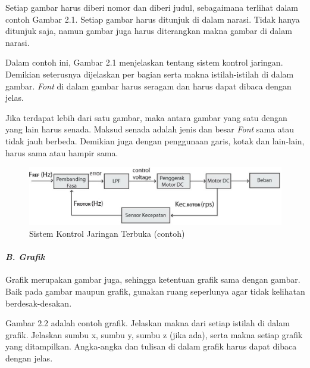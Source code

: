 \documentclass[12pt]{article}
\begin{document}
Setiap gambar harus diberi nomor dan diberi judul, sebagaimana terlihat dalam contoh Gambar 2.1. Setiap gambar harus ditunjuk di dalam narasi. Tidak hanya ditunjuk saja, namun gambar juga harus diterangkan makna gambar di dalam narasi.

Dalam contoh ini, Gambar 2.1 menjelaskan tentang sistem kontrol jaringan. Demikian seterusnya dijelaskan per bagian serta makna istilah-istilah di dalam gambar. \textit{Font} di dalam gambar harus seragam dan harus dapat dibaca dengan jelas. 

Jika terdapat lebih dari satu gambar, maka antara gambar yang satu dengan yang lain harus senada. Maksud senada adalah jenis dan besar \textit{Font} sama atau tidak jauh berbeda. Demikian juga dengan penggunaan garis, kotak dan lain-lain, harus sama atau hampir sama. 

\begin{figure}
\centering
 	\includegraphics[width=1\textwidth]{img-2.png}
 	\caption{Sistem Kontrol Jaringan Terbuka (contoh)}  
\end{figure}
\pagebreak



\paragraph{\textit{B. Grafik}}\mbox{}

Grafik merupakan gambar juga, sehingga ketentuan grafik sama dengan gambar. Baik pada gambar maupun grafik, gunakan ruang seperlunya agar tidak kelihatan berdesak-desakan.

Gambar 2.2 adalah contoh grafik. Jelaskan makna dari setiap istilah di dalam grafik. Jelaskan sumbu x, sumbu y, sumbu z (jika ada), serta makna setiap grafik yang ditampilkan. Angka-angka dan tulisan di dalam grafik harus dapat dibaca dengan jelas.
\end{document}
